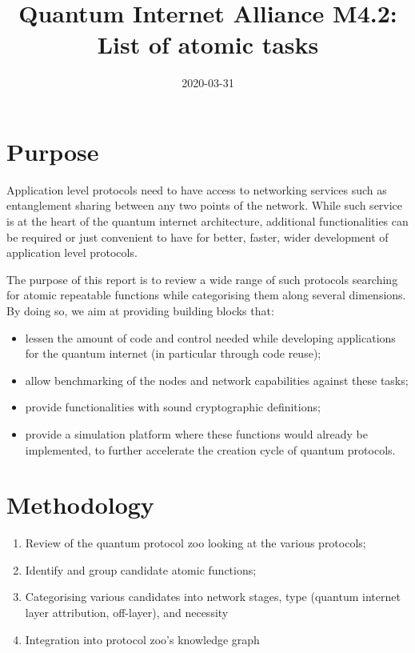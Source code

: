 \documentclass[11pt]{article}
\date{2020-03-31}
\title{Quantum Internet Alliance M4.2: List of atomic tasks}
\begin{document}
\maketitle


\section{Purpose}
\label{sec:org2a74cac}
Application level protocols need to have access to networking services such as entanglement sharing between any two points of the network. While such service is at the heart of the quantum internet architecture, additional functionalities can be required or just convenient to have for better, faster, wider development of application level protocols. 

The purpose of this report is to review a wide range of such protocols searching for atomic repeatable functions while categorising them along several dimensions. By doing so, we aim at providing building blocks that:
\begin{itemize}
\item lessen the amount of code and control needed while developing applications for the quantum internet (in particular through code reuse);
\item allow benchmarking of the nodes and network capabilities against these tasks;
\item provide functionalities with sound cryptographic definitions;
\item provide a simulation platform where these functions would already be implemented, to further accelerate the creation cycle of quantum protocols.
\end{itemize}

\section{Methodology}
\label{sec:orga13ff24}
\begin{enumerate}
\item Review of the quantum protocol zoo looking at the various protocols;
\item Identify and group candidate atomic functions;
\item Categorising various candidates into network stages, type (quantum internet layer attribution, off-layer), and necessity
\item Integration into protocol zoo's knowledge graph
\end{enumerate}
\end{document}
